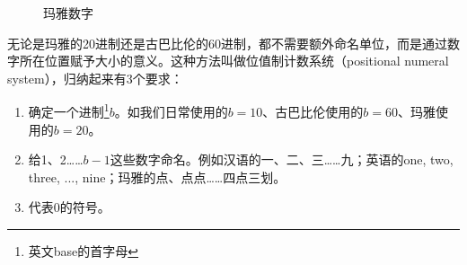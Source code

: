 \documentclass[b5paper]{ctexart}
\begin{document}
\begin{figure}[htbp]
 \centering
 \caption{玛雅数字}
 \label{fig:maya-numerals}
\end{figure}

无论是玛雅的20进制还是古巴比伦的60进制，都不需要额外命名单位，而是通过数字所在位置赋予大小的意义。这种方法叫做位值制计数系统（positional numeral system），归纳起来有3个要求：

\begin{enumerate}[1)]
\item 确定一个进制\footnote{英文base的首字母}$b$。如我们日常使用的$b = 10$、古巴比伦使用的$b = 60$、玛雅使用的$b = 20$。
\item 给1、2……$b-1$这些数字命名。例如汉语的一、二、三……九；英语的one, two, three, ..., nine；玛雅的点、点点……四点三划。
\item 代表0的符号。
\end{enumerate}
\end{document}
